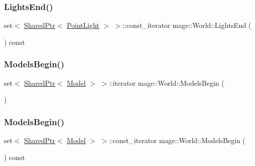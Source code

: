 \hypertarget{classmage_1_1_world_a752ce259cdcffdfba51e2c9e480d2ddc}{}\label{classmage_1_1_world_a752ce259cdcffdfba51e2c9e480d2ddc} 
\subsubsection{\texorpdfstring{Lights\+End()}{LightsEnd()}\hspace{0.1cm}{\footnotesize\ttfamily [2/2]}}
{\footnotesize\ttfamily set$<$ \hyperlink{namespacemage_a1e01ae66713838a7a67d30e44c67703e}{Shared\+Ptr}$<$ \hyperlink{classmage_1_1_point_light}{Point\+Light} $>$ $>$\+::const\+\_\+iterator mage\+::\+World\+::\+Lights\+End (\begin{DoxyParamCaption}{ }\end{DoxyParamCaption}) const}

\hypertarget{classmage_1_1_world_acdbf2922c2b755fb9ff368b3bab3edb1}{}\label{classmage_1_1_world_acdbf2922c2b755fb9ff368b3bab3edb1} 
\subsubsection{\texorpdfstring{Models\+Begin()}{ModelsBegin()}\hspace{0.1cm}{\footnotesize\ttfamily [1/2]}}
{\footnotesize\ttfamily set$<$ \hyperlink{namespacemage_a1e01ae66713838a7a67d30e44c67703e}{Shared\+Ptr}$<$ \hyperlink{classmage_1_1_model}{Model} $>$ $>$\+::iterator mage\+::\+World\+::\+Models\+Begin (\begin{DoxyParamCaption}{ }\end{DoxyParamCaption})}

\hypertarget{classmage_1_1_world_a38b6ada350e36132f94df20fb0365177}{}\label{classmage_1_1_world_a38b6ada350e36132f94df20fb0365177} 
\subsubsection{\texorpdfstring{Models\+Begin()}{ModelsBegin()}\hspace{0.1cm}{\footnotesize\ttfamily [2/2]}}
{\footnotesize\ttfamily set$<$ \hyperlink{namespacemage_a1e01ae66713838a7a67d30e44c67703e}{Shared\+Ptr}$<$ \hyperlink{classmage_1_1_model}{Model} $>$ $>$\+::const\+\_\+iterator mage\+::\+World\+::\+Models\+Begin (\begin{DoxyParamCaption}{ }\end{DoxyParamCaption}) const}

